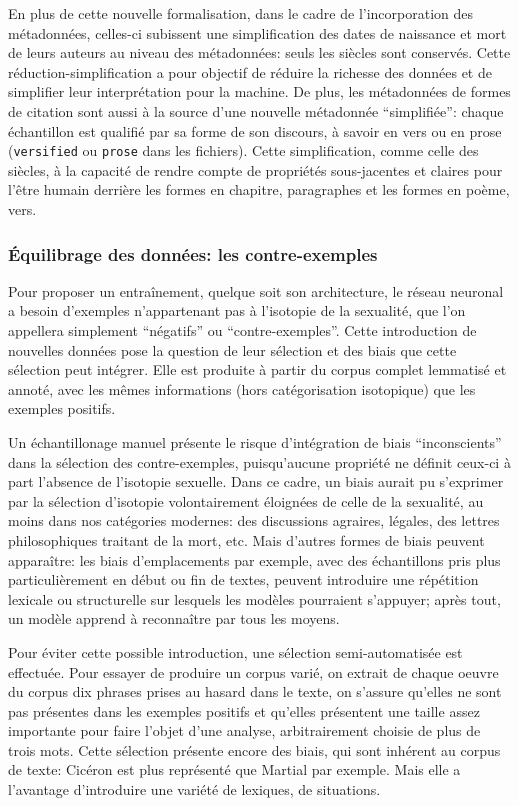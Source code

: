 En plus de cette nouvelle formalisation, dans le cadre de l'incorporation des métadonnées, celles-ci subissent une simplification des dates de naissance et mort de leurs auteurs au niveau des métadonnées: seuls les siècles sont conservés. Cette réduction-simplification a pour objectif de réduire la richesse des données et de simplifier leur interprétation pour la machine. De plus, les métadonnées de formes de citation sont aussi à la source d'une nouvelle métadonnée \enquote{simplifiée}: chaque échantillon est qualifié par sa forme de son discours, à savoir en vers ou en prose (\texttt{versified} ou \texttt{prose} dans les fichiers). Cette simplification, comme celle des siècles, à la capacité de rendre compte de propriétés sous-jacentes et claires pour l'être humain derrière les formes en chapitre, paragraphes et les formes en poème, vers.


\subsubsection{Équilibrage des données: les contre-exemples}

Pour proposer un entraînement, quelque soit son architecture, le réseau neuronal a besoin d'exemples n'appartenant pas à l'isotopie de la sexualité, que l'on appellera simplement \enquote{négatifs} ou \enquote{contre-exemples}. Cette introduction de nouvelles données pose la question de leur sélection et des biais que cette sélection peut intégrer. Elle est produite à partir du corpus complet lemmatisé et annoté, avec les mêmes informations (hors catégorisation isotopique) que les exemples positifs.

Un échantillonage manuel présente le risque d'intégration de biais \enquote{inconscients} dans la sélection des contre-exemples, puisqu'aucune propriété ne définit ceux-ci à part l'absence de l'isotopie sexuelle. Dans ce cadre, un biais aurait pu s'exprimer par la sélection d'isotopie volontairement éloignées de celle de la sexualité, au moins dans nos catégories modernes: des discussions agraires, légales, des lettres philosophiques traitant de la mort, etc. Mais d'autres formes de biais peuvent apparaître: les biais d'emplacements par exemple, avec des échantillons pris plus particulièrement en début ou fin de textes, peuvent introduire une répétition lexicale ou structurelle sur lesquels les modèles pourraient s'appuyer; après tout, un modèle apprend à reconnaître par tous les moyens.

Pour éviter cette possible introduction, une sélection semi-automatisée est effectuée. Pour essayer de produire un corpus varié, on extrait de chaque oeuvre du corpus dix phrases prises au hasard dans le texte, on s'assure qu'elles ne sont pas présentes dans les exemples positifs et qu'elles présentent une taille assez importante pour faire l'objet d'une analyse, arbitrairement choisie de plus de trois mots. Cette sélection présente encore des biais, qui sont inhérent au corpus de texte: Cicéron est plus représenté que Martial par exemple. Mais elle a l'avantage d'introduire une variété de lexiques, de situations.

